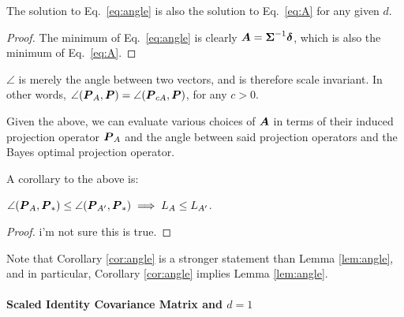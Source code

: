\documentclass[10pt]{article}
\begin{document}
\begin{lem} \label{lem:angle}
The solution to Eq.~\eqref{eq:angle} is also the solution to Eq.~\eqref{eq:A} for any given $d$.
\end{lem}

\begin{proof}
The minimum of Eq.~\eqref{eq:angle} is clearly $\boldsymbol{A}=\boldsymbol{\Sigma}^{-1} \boldsymbol{\delta}$, which is also the minimum of Eq.~\eqref{eq:A}.
\end{proof}


\begin{remark} 
$\angle$ is merely the angle between two vectors, and is therefore scale invariant.  In other words, $\angle(\boldsymbol{P}_A,\boldsymbol{P})=\angle(\boldsymbol{P}_{c A},\boldsymbol{P})$, for any $c > 0$.
\end{remark}

Given the above, we can evaluate various choices of $\boldsymbol{A}$ in terms of their induced projection operator $\boldsymbol{P}_A$ and the angle between said projection operators and the Bayes optimal projection operator.  


A corollary to the above is:
\begin{cor} \label{cor:angle}
$\angle(\boldsymbol{P}_A,\boldsymbol{P}_*) \leq \angle(\boldsymbol{P}_{A'},\boldsymbol{P}_*) \implies L_A \leq L_{A'}$.
\end{cor}

\begin{proof}
i'm not sure this is true.
\end{proof}
Note that Corollary \ref{cor:angle} is a stronger statement than Lemma \ref{lem:angle}, and in particular, Corollary \ref{cor:angle} implies Lemma \ref{lem:angle}.




\newpage
\paragraph{Scaled Identity Covariance Matrix and $d=1$}
\end{document}
